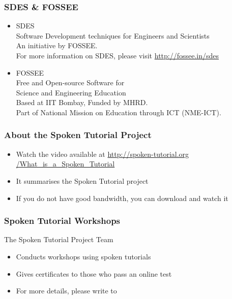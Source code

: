 \documentclass[17pt,compress]{beamer}
\begin{document}
\begin{frame}
\frametitle{SDES \& FOSSEE}
\begin{center}
\begin{itemize}
\item \small{SDES}\\
\small{\color{LimeGreen}Software Development techniques for Engineers and Scientists} \\
\scriptsize An initiative by FOSSEE. \\
\vspace{3pt}
\scriptsize For more information on SDES, please visit {\color{blue}\url{http://fossee.in/sdes}}\\
\vspace{12pt}
\item \small{FOSSEE}\\
\small {\color{LimeGreen}Free and Open-source Software for \\Science and Engineering Education} \\
\scriptsize Based at IIT Bombay, Funded by MHRD.\\
\vspace{3pt}
\scriptsize Part of National Mission on Education through ICT (NME-ICT). \\
\end{itemize}
\end{center}
\end{frame}

\begin{frame}
\frametitle{About the Spoken Tutorial Project}
\begin{itemize}
\item Watch the video available at {\color{blue}\url{http://spoken-tutorial.org /What\_is\_a\_Spoken\_Tutorial}} 
\item It summarises the Spoken Tutorial project 
\item If you do not have good bandwidth, you can download and watch it
\end{itemize}
\end{frame}

\begin{frame}
\frametitle{Spoken Tutorial Workshops}The Spoken Tutorial Project Team 
\begin{itemize}
\item Conducts workshops using spoken tutorials 
\item Gives certificates to those who pass an online test 
\item For more details, please write to \\ 
\end{itemize}
\end{frame}
\end{document}

